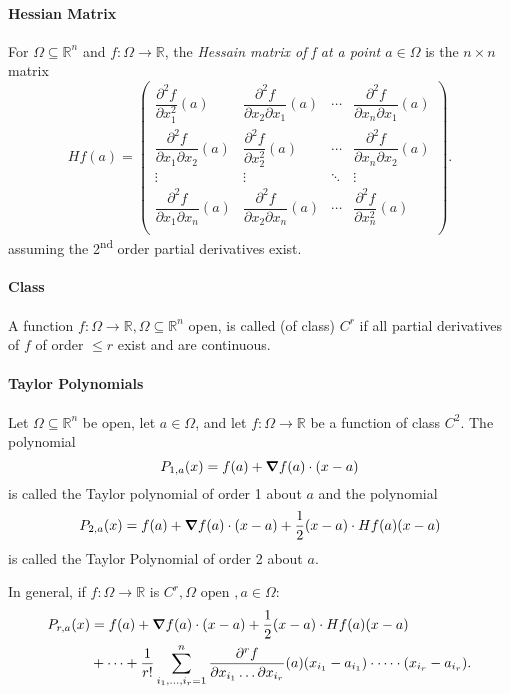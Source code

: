 \paragraph{Hessian Matrix}
For \(\Omega \subseteq \mathbb R^n\) and \(f:\Omega\to\mathbb R\), the 
\textit{Hessain matrix of f at a point \(a \in \Omega\)} is the \(n \times n\) matrix
\[
    Hf(a) =
    \begin{pmatrix}
        \dfrac{\partial^2 f}{\partial x_1^2}(a) & \dfrac{\partial^2 f}{\partial x_2 \partial x_1}(a) & \cdots &\dfrac{\partial^2 f}{\partial x_n \partial x_1}(a) \\
        \dfrac{\partial^2 f}{\partial x_1 \partial x_2}(a) & \dfrac{\partial^2 f}{\partial x_2^2}(a) & \cdots &\dfrac{\partial^2 f}{\partial x_n \partial x_2}(a) \\
        \vdots & \vdots & \ddots & \vdots \\
        \dfrac{\partial^2 f}{\partial x_1 \partial x_n}(a) & \dfrac{\partial^2 f}{\partial x_2 \partial x_n}(a) & \cdots &\dfrac{\partial^2 f}{\partial x_n^2}(a) \\
    \end{pmatrix}.
\]
assuming the 2\textsuperscript{nd} order partial derivatives exist.

\paragraph{Class}
A function \(f:\Omega \to \mathbb R, \Omega \subseteq \mathbb R^n\) open,
is called (of class) \(C^r\) if all partial derivatives of \(f\) of order \(\leq r\)
exist and are continuous.

\paragraph{Taylor Polynomials}
Let \(\Omega \subseteq \mathbb R^n\) be open, let \(a \in \Omega\), and let 
\(f:\Omega \to \mathbb R\) be a function of class \(C^2\). The polynomial
\[P_{1, a}(x) = f(a) + \grad f(a)\cdot (x-a)\]
is called the Taylor polynomial of order 1 about \(a\) and the polynomial
\[P_{2, a}(x) = f(a) + \grad f(a)\cdot (x-a) + \frac{1}{2}(x-a)\cdot Hf(a)(x-a)\]
is called the Taylor Polynomial of order 2 about \(a\).

In general, if \(f:\Omega \to \mathbb R\) is \(C^r, \Omega \text{ open }, a \in \Omega\):
\begin{align*}
    P_{r,a}(x) & = f(a) + \grad f(a)\cdot (x-a) + \frac{1}{2}(x-a)\cdot Hf(a)(x-a) \\
    & +\cdots + \frac{1}{r!}\sum_{i_1,\dots,i_r=1}^n \frac{\partial^r f}{\partial x_{i_1} \dots \partial x_{i_r}}(a)(x_{i_1} - a_{i_1}) \cdot \dots \cdot (x_{i_r}-a_{i_r}).
\end{align*}

